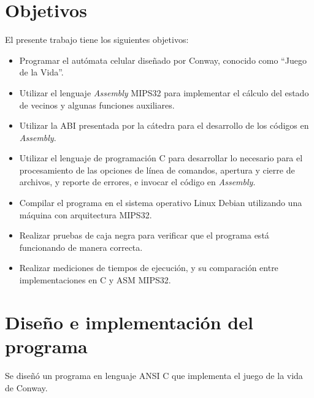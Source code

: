 \documentclass[a4paper,12pt]{article}
\newcommand{\quotes}[1]{``#1''}
\numberwithin{equation}{section}
\numberwithin{figure}{section}
\begin{document}
	\section{Objetivos}
	El presente trabajo tiene los siguientes objetivos:
	\begin{itemize}
		\item Programar el autómata celular diseñado por Conway, conocido como \quotes{Juego de la Vida}.
		\item Utilizar el lenguaje \textit{Assembly} MIPS32 para implementar el cálculo del estado de vecinos y algunas funciones auxiliares.
		\item Utilizar la ABI presentada por la cátedra para el desarrollo de los códigos en \textit{Assembly}.
		\item Utilizar el lenguaje de programación C para desarrollar lo necesario para el procesamiento de las opciones de línea de comandos, apertura y cierre de archivos, y reporte de errores, e invocar el código en \textit{Assembly}.
		\item Compilar el programa en el sistema operativo Linux Debian utilizando una máquina con arquitectura MIPS32.
		\item Realizar pruebas de caja negra para verificar que el programa está funcionando de manera correcta.
		\item Realizar mediciones de tiempos de ejecución, y su comparación entre implementaciones en C y ASM MIPS32.
	\end{itemize}
	
	\section{Diseño e implementación del programa}
	
	Se diseñó un programa en lenguaje ANSI C que implementa el juego de la vida de Conway.
	
\end{document}
